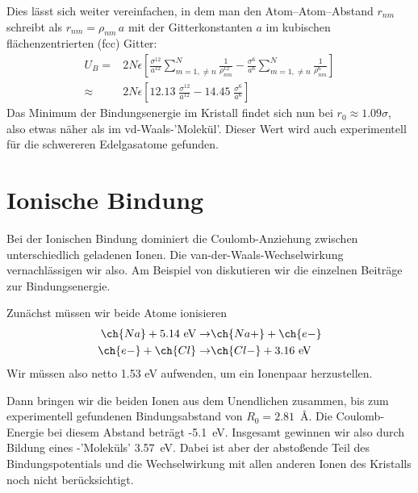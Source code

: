 Dies lässt sich weiter vereinfachen, in dem man den Atom--Atom--Abstand $r_{nm}$ schreibt als $r_{nm} = \rho_{nm} \, a$  mit der Gitterkonstanten $a$ im kubischen flächenzentrierten (fcc) Gitter:
\begin{align}
U_B = & 
2 N \epsilon 
\left[ 
\frac{\sigma^{12}}{a^{12}}
\sum_{m=1,   \neq n}^N  \frac{1}{\rho_{nm}^{12}} 
-
\frac{\sigma^{6}}{a^{6}}
\sum_{m=1,   \neq n}^N  \frac{1}{\rho_{nm}^{6}} 
\right] \\
\approx & 
2 N \epsilon 
\left[ 
12.13 \; \frac{\sigma^{12}}{a^{12}}
-
14.45 \; \frac{\sigma^{6}}{a^{6}}
\right] 
\end{align}
Das Minimum der Bindungsenergie im Kristall findet sich nun bei $r_0 \approx 1.09 \sigma$, also etwas näher als im vd-Waals-'Molekül'. Dieser Wert wird auch experimentell für die schwereren Edelgasatome gefunden.

\section{Ionische Bindung}

Bei der Ionischen Bindung dominiert die Coulomb-Anziehung zwischen unterschiedlich geladenen Ionen. Die van-der-Waals-Wechselwirkung vernachlässigen wir also. Am Beispiel von  diskutieren wir die einzelnen Beiträge zur Bindungsenergie.

Zunächst müssen wir beide Atome ionisieren
\begin{align}
 \ch{Na} + 5.14\text{ eV} \rightarrow  & \ch{Na+} + \ch{e-} \\
  \ch{e-}  + \ch{Cl} \rightarrow  & \ch{Cl-} + 3.16\text{ eV}
\end{align}
Wir müssen also netto 1.53 eV aufwenden, um ein Ionenpaar herzustellen.

Dann bringen wir die beiden Ionen aus dem Unendlichen zusammen, bis zum experimentell gefundenen Bindungsabstand von $R_0 = 2.81$~\AA. Die Coulomb-Energie bei diesem Abstand beträgt -5.1~eV. Insgesamt gewinnen wir also durch Bildung eines -'Moleküls' 3.57~eV. Dabei ist aber der abstoßende Teil des Bindungspotentials und die Wechselwirkung mit allen anderen Ionen des Kristalls noch nicht berücksichtigt.

